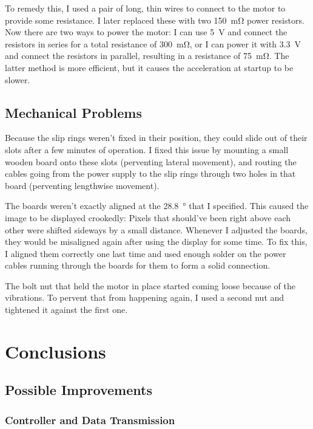 \documentclass[a4paper, 11pt, titlepage]{report}
\begin{document}
To remedy this, I used a pair of long, thin wires to connect to the motor to provide some
resistance. I later replaced these with two \SI{150}{\milli\ohm} power resistors. Now there are two
ways to power the motor: I can use \SI{5}{\volt} and connect the resistors in series for a total
resistance of \SI{300}{\milli\ohm}, or I can power it with \SI{3.3}{\volt} and connect the
resistors in parallel, resulting in a resistance of \SI{75}{\milli\ohm}. The latter method is more
efficient, but it causes the acceleration at startup to be slower.


\section{Mechanical Problems}

Because the slip rings weren't fixed in their position, they could slide out of their slots after
a few minutes of operation. I fixed this issue by mounting a small wooden board onto these slots
(perventing lateral movement), and routing the cables going from the power supply to the slip rings
through two holes in that board (perventing lengthwise movement).

The boards weren't exactly aligned at the \SI{28.8}{\degree} that I specified. This caused the
image to be displayed crookedly: Pixels that should've been right above each other were shifted
sideways by a small distance. Whenever I adjusted the boards, they would be misaligned again after
using the display for some time. To fix this, I aligned them correctly one last time and used
enough solder on the power cables running through the boards for them to form a solid connection.

The bolt nut that held the motor in place started coming loose because of the vibrations. To
pervent that from happening again, I used a second nut and tightened it against the first one.


\chapter{Conclusions}

\section{Possible Improvements}

\subsection{Controller and Data Transmission}
\end{document}
